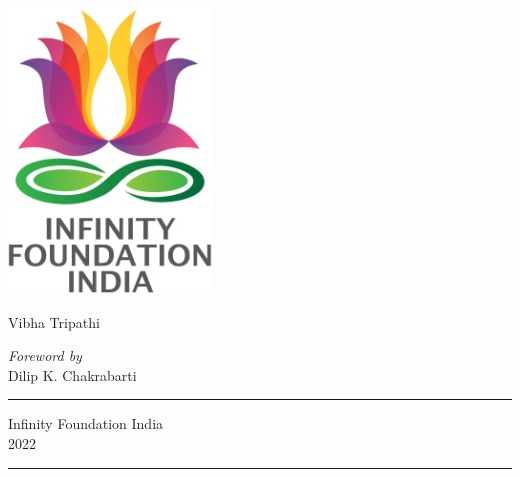\thispagestyle{empty}
\begin{center}
\includegraphics[scale=0.3]{images/logo.png}
\bigskip


\bigskip
\end{center}
\medskip

\begin{center}
{\fontsize{20}{24}\selectfont {History of Iron Technology in India}}

\medskip

{\fontsize{11}{15}\selectfont {(From Beginning to Pre-modern Times)}}

\vfill


\bigskip
 
{\fontsize{11}{15}\selectfont 
Vibha Tripathi}\par

\bigskip
 
{\fontsize{8}{10}\selectfont 
{\textit{Foreword by}}\\[3pt]
Dilip K. Chakrabarti}\par
\vfill

\rule{5cm}{1pt}

{\fontsize{12}{14}\selectfont
Infinity Foundation India\\[4pt]
2022}

\rule{5cm}{1pt}
\end{center}




